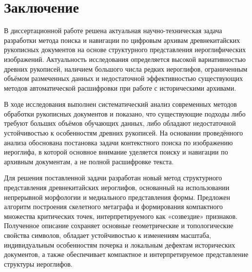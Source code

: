 \chapter*{Заключение}                       %


% 

В диссертационной работе решена актуальная научно-техническая задача разработки метода поиска и навигации по цифровым архивам древнекитайских рукописных документов на основе структурного представления иероглифических изображений. Актуальность исследования определяется высокой вариативностью древних рукописей, наличием большого числа редких иероглифов, ограниченным объёмом размеченных данных и недостаточной эффективностью существующих методов автоматической расшифровки при работе с историческими архивами.

В ходе исследования выполнен систематический анализ современных методов обработки рукописных документов и показано, что существующие подходы либо требуют больших объёмов обучающих данных, либо обладают недостаточной устойчивостью к особенностям древних рукописей. На основании проведённого анализа обоснована постановка задачи контекстного поиска по изображению иероглифа, в которой основное внимание уделяется поиску и навигации по архивным документам, а не полной расшифровке текста.

Для решения поставленной задачи разработан новый метод структурного представления древнекитайских иероглифов, основанный на использовании непрерывной морфологии и медиального представления формы. Предложен алгоритм построения скелетного метаграфа и формирования компактного множества критических точек, интерпретируемого как «созвездие» признаков. Полученное описание сохраняет основные геометрические и топологические свойства символов, обладает устойчивостью к изменениям масштаба, индивидуальным особенностям почерка и локальным дефектам исторических документов, а также обеспечивает компактное и интерпретируемое представление структуры иероглифов.

